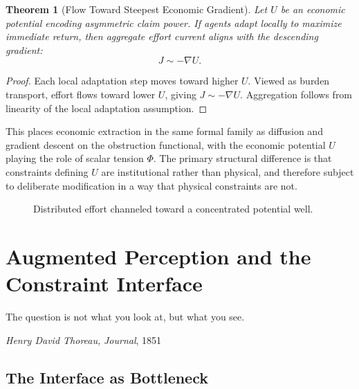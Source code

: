 \documentclass[12pt,a4paper,openany]{book}
\theoremstyle{plain}
\newtheorem{theorem}{Theorem}[chapter]
\theoremstyle{definition}
\theoremstyle{remark}
\begin{document}
\begin{theorem}[Flow Toward Steepest Economic Gradient]
Let $U$ be an economic potential encoding asymmetric claim power. If agents adapt locally to maximize immediate return, then aggregate effort current aligns with the descending gradient:
\[
J \sim -\nabla U.
\]
\end{theorem}

\begin{proof}
Each local adaptation step moves toward higher $U$. Viewed as burden transport, effort flows toward lower $U$, giving $J \sim -\nabla U$. Aggregation follows from linearity of the local adaptation assumption.
\end{proof}

This places economic extraction in the same formal family as diffusion and gradient descent on the obstruction functional, with the economic potential $U$ playing the role of scalar tension $\Phi$. The primary structural difference is that constraints defining $U$ are institutional rather than physical, and therefore subject to deliberate modification in a way that physical constraints are not.

\begin{figure}[h]
\centering
{}
\caption[Extraction field]{Distributed effort channeled toward a concentrated potential well.}
\label{fig:glyph_extraction}
\end{figure}

\chapter{Augmented Perception and the Constraint Interface}

\epigraph{%
  The question is not what you look at, but what you see.
}{%
  \textit{Henry David Thoreau,} \textit{Journal}, 1851
}

\section{The Interface as Bottleneck}
\end{document}
